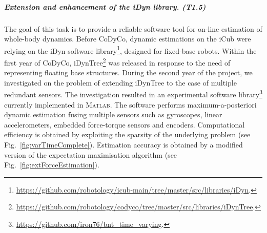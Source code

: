 \subparagraph{Extension and enhancement of the iDyn library. (T1.5)}
\label{sec:T15}
 
The goal of this task is to provide a reliable software tool for on-line
estimation of whole-body dynamics.  Before CoDyCo, dynamic estimations on the
iCub were relying on the iDyn software
library\footnote{\url{https://github.com/robotology/icub-main/tree/master/src/libraries/iDyn}.},
designed for fixed-base robots.  Within the first year of CoDyCo,
iDynTree\footnote{{\url{https://github.com/robotology/codyco/tree/master/src/libraries/iDynTree}}.}
was released in response to the need of representing floating base structures.
During the second year of the project, we investigated on the problem of
extending iDynTree to the case of multiple redundant sensors.  The
investigation resulted in an experimental software
library\footnote{\url{https://github.com/iron76/bnt_time_varying}.} currently
implemented in \textsc{Matlab}.  The software performs maximum-a-posteriori
dynamic estimation fusing multiple sensors such as gyroscopes, linear
accelerometers, embedded force-torque sensors and encoders.  Computational
efficiency is obtained by exploiting the sparsity of the underlying problem
\cite{Nori2015} (see Fig.~\ref{fig:varTimeComplete}).  Estimation accuracy is
obtained by a modified version of the expectation maximisation algorithm
\cite{Nori2015b} (see Fig.~\ref{fig:extForceEstimation}).

